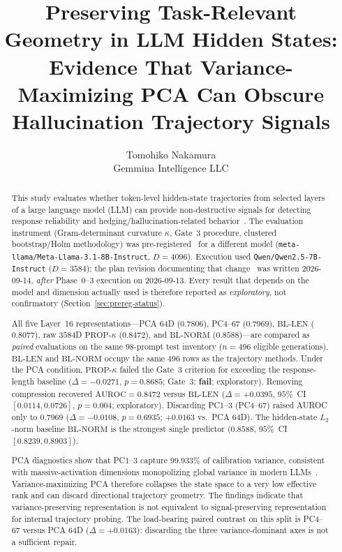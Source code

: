 \documentclass{article}
\title{Preserving Task-Relevant Geometry in {LLM} Hidden States:\\
Evidence That Variance-Maximizing {PCA} Can Obscure Hallucination Trajectory Signals}
\author{%
  Tomohiko Nakamura \\
  Gemmina Intelligence LLC
}
\newcommand{\auroc}{\mathrm{AUROC}}
\newcommand{\propk}{\mathrm{PROP}\text{-}\kappa}
\newcommand{\bllen}{\mathrm{BL\text{-}LEN}}
\newcommand{\blnorm}{\mathrm{BL\text{-}NORM}}
\begin{document}
\maketitle

\begin{abstract}
This study evaluates whether token-level hidden-state trajectories from selected layers of a large language model ({LLM}) can provide non-destructive signals for detecting response reliability and hedging/hallucination-related behavior~\citep{ji2023survey,azaria2023internal,farquhar2024semantic}. The evaluation instrument (Gram-determinant curvature $\kappa$, Gate~3 procedure, clustered bootstrap/{Holm} methodology) was pre-registered~\citep{nosek2018prereg,exptrj001planv13} for a different model (\texttt{meta-llama/Meta-Llama-3.1-8B-Instruct}, $D=4096$). Execution used \texttt{Qwen/Qwen2.5-7B-Instruct} ($D=3584$); the plan revision documenting that change~\citep{exptrj001plan} was written 2026-09-14, \emph{after} Phase~0--3 execution on 2026-09-13. Every result that depends on the model and dimension actually used is therefore reported as \emph{exploratory}, not confirmatory (Section~\ref{sec:prereg-status}).

All five Layer~16 representations---{PCA} $64${D} ($0.7806$), {PC4}--{67} ($0.7969$), $\bllen$ ($0.8077$), raw $3584${D} $\propk$ ($0.8472$), and $\blnorm$ ($0.8588$)---are compared as \emph{paired} evaluations on the same $98$-prompt test inventory ($n=496$ eligible generations). $\bllen$ and $\blnorm$ occupy the same $496$ rows as the trajectory methods. Under the {PCA} condition, $\propk$ failed the Gate~3 criterion for exceeding the response-length baseline ($\Delta=-0.0271$, $p=0.8685$; Gate~3: \textbf{fail}; exploratory). Removing compression recovered $\auroc=0.8472$ versus $\bllen$ ($\Delta=+0.0395$, $95\%$~{CI} $[0.0114, 0.0726]$, $p=0.004$; exploratory). Discarding {PC1}--{3} ({PC4}--{67}) raised {AUROC} only to $0.7969$ ($\Delta=-0.0108$, $p=0.6935$; $+0.0163$ vs.\ {PCA} $64${D}). The hidden-state $L_2$-norm baseline $\blnorm$ is the strongest single predictor ($0.8588$, $95\%$~{CI} $[0.8239, 0.8903]$).

{PCA} diagnostics show that {PC1}--{3} capture $99.933\%$ of calibration variance, consistent with massive-activation dimensions monopolizing global variance in modern {LLMs}~\citep{sun2024massive}. Variance-maximizing {PCA} therefore collapses the state space to a very low effective rank and can discard directional trajectory geometry. The findings indicate that variance-preserving representation is not equivalent to signal-preserving representation for internal trajectory probing. The load-bearing paired contrast on this split is {PC4}--{67} versus {PCA} $64${D} ($\Delta=+0.0163$): discarding the three variance-dominant axes is not a sufficient repair.
\end{abstract}
\end{document}
